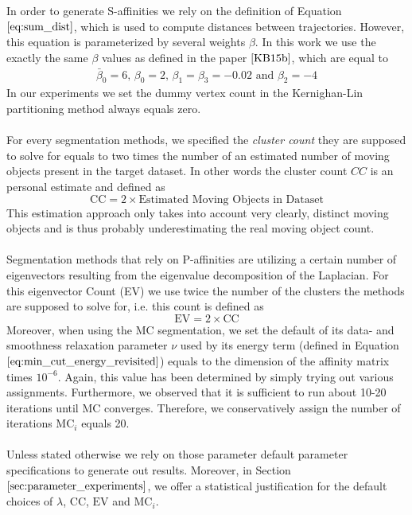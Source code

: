 In order to generate S-affinities we rely on the definition of Equation $\ref{eq:sum_dist}$, which is used to compute distances between trajectories. However, this equation is parameterized by several weights $\beta$. In this work we use the exactly the same $\beta$ values as defined in the paper $\cite{KB15b}$, which are equal to
\begin{equation}
\begin{aligned}
\bar{\beta}_0 = 6 \text{, } \beta_0 = 2 \text{, } \beta_1 = \beta_3 = -0.02 \text{ and } \beta_2 = -4
\end{aligned}
\end{equation}
In our experiments we set the dummy vertex count in the Kernighan-Lin partitioning method always equals zero. \\ \\
For every segmentation methods, we specified the \textit{cluster count} they are supposed to solve for equals to two times the number of an estimated number of moving objects present in the target dataset. In other words the cluster count $CC$ is an personal estimate and defined as
\begin{equation}
	\text{CC} = 2 \times \text{Estimated Moving Objects in Dataset}
\label{eq:cc_def} 
\end{equation}
This estimation approach only takes into account very clearly, distinct moving objects and is thus probably underestimating the real moving object count. \\ \\
Segmentation methods that rely on P-affinities are utilizing a certain number of eigenvectors resulting from the eigenvalue decomposition of the Laplacian. For this eigenvector Count (EV) we use twice the number of the clusters the methods are supposed to solve for, i.e. this count is defined as
\begin{equation}
	\text{EV} = 2 \times \text{CC}
\end{equation}
Moreover, when using the MC segmentation, we set the default of its data- and smoothness relaxation parameter $\nu$ used by its energy term (defined in Equation $\ref{eq:min_cut_energy_revisited}$) equals to the dimension of the affinity matrix times $10^{-6}$. Again, this value has been determined by simply trying out various assignments. Furthermore, we observed that it is sufficient to run about 10-20 iterations until MC converges. Therefore, we conservatively assign the number of iterations $\text{MC}_i$ equals 20. \\ \\
Unless stated otherwise we rely on those parameter default parameter specifications to generate out results. Moreover, in Section $\ref{sec:parameter_experiments}$, we offer a statistical justification for the default choices of $\lambda$, $\text{CC}$, $\text{EV}$ and $\text{MC}_i$.

